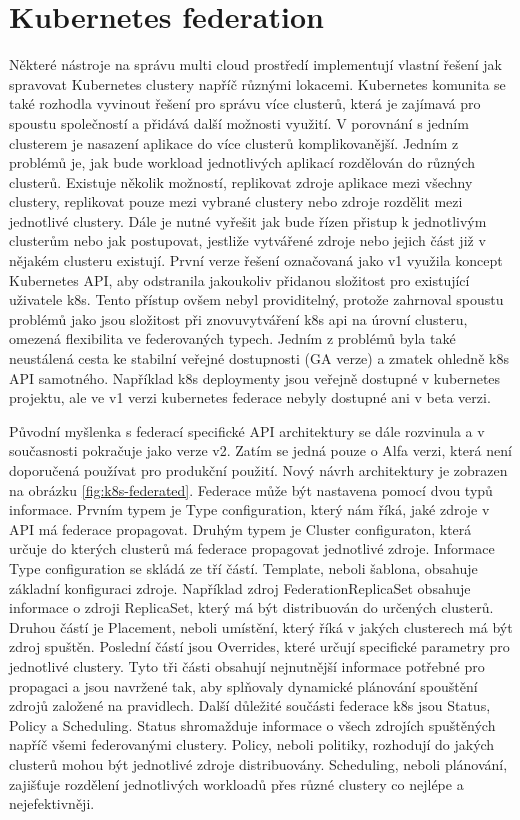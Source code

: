 \section{Kubernetes federation}
Některé nástroje na správu multi cloud prostředí implementují vlastní řešení jak spravovat Kubernetes clustery napříč různými lokacemi. Kubernetes komunita se také \linebreak rozhodla vyvinout řešení pro správu více clusterů, která je zajímavá pro spoustu \linebreak společností a přidává další možnosti využití. V porovnání s jedním clusterem je nasazení aplikace do více clusterů komplikovanější. Jedním z problémů je, jak bude workload jednotlivých aplikací rozdělován do různých clusterů. Existuje několik možností, replikovat zdroje aplikace mezi všechny clustery, replikovat pouze mezi vybrané clustery nebo zdroje rozdělit mezi jednotlivé clustery. Dále je nutné vyřešit jak bude řízen přistup k jednotlivým clusterům nebo jak postupovat, jestliže vytvářené zdroje nebo jejich část již v nějakém clusteru existují. První verze řešení označovaná jako v1 využila koncept Kubernetes API, aby odstranila jakoukoliv přidanou složitost pro existující uživatele k8s. Tento přístup ovšem nebyl providitelný, protože zahrnoval spoustu problémů jako jsou složitost při znovuvytváření k8s api na úrovní clusteru, omezená flexibilita ve federovaných typech. Jedním z problémů byla také neustálená cesta ke stabilní veřejné dostupnosti (GA verze) a zmatek ohledně k8s API samotného. Například k8s deploymenty jsou veřejně dostupné v kubernetes projektu, ale ve v1 verzi kubernetes federace nebyly dostupné ani v beta verzi. \par
    Původní myšlenka s federací specifické API architektury se dále rozvinula a v současnosti pokračuje jako verze v2. Zatím se jedná pouze o Alfa verzi, která není doporučená používat pro produkční použití. Nový návrh architektury je zobrazen na obrázku \ref{fig:k8s-federated}. Federace může být nastavena pomocí dvou typů informace. Prvním typem je Type configuration, který nám říká, jaké zdroje v API má federace propagovat. Druhým typem je Cluster configuraton, která určuje do kterých clusterů má federace propagovat jednotlivé zdroje. Informace Type configuration se skládá ze tří částí. Template, neboli šablona, obsahuje základní konfiguraci zdroje. Například zdroj FederationReplicaSet obsahuje informace o zdroji ReplicaSet, který má být distribuován do určených clusterů. Druhou částí je Placement, neboli umístění, který říká v jakých clusterech má být zdroj spuštěn. Poslední částí jsou Overrides, které určují specifické parametry pro jednotlivé clustery. Tyto tři části obsahují nejnutnější informace potřebné pro propagaci a jsou navržené tak, aby splňovaly dynamické plánování spouštění zdrojů založené na pravidlech. Další důležité součásti federace k8s jsou Status, Policy a Scheduling. Status shromažduje informace o všech zdrojích spuštěných napříč všemi federovanými clustery. Policy, neboli politiky, rozhodují do jakých clusterů mohou být jednotlivé zdroje distribuovány. Scheduling, neboli plánování, zajišťuje rozdělení jednotlivých workloadů přes různé clustery co nejlépe a nejefektivněji.\par 
